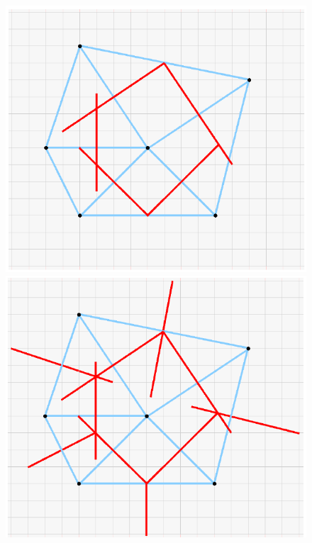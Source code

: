 \begin{figure}[H]
\begin{minipage}{0.49\columnwidth}
    \end{minipage}\hfill
    \begin{minipage}{0.49\columnwidth}
        \includegraphics[width=\columnwidth]{images/semaine13_maillage3.png}
    \end{minipage}\hfill
    \begin{minipage}{0.49\columnwidth}
        \includegraphics[width=\columnwidth]{images/semaine13_maillage4.png}
    \end{minipage}\hfill

\end{figure}
